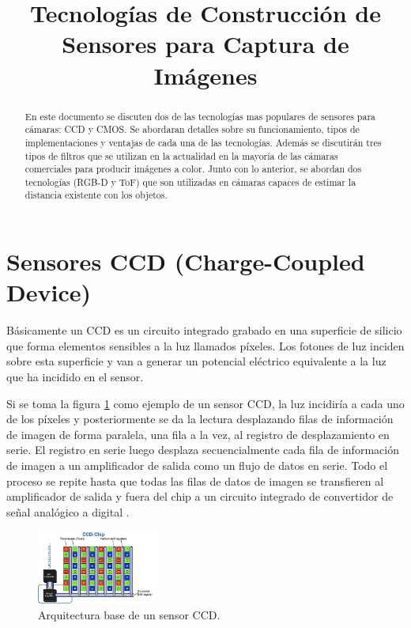 \documentclass[conference]{IEEEtran}
\begin{document}
\title{Tecnologías de Construcción de Sensores para Captura de Imágenes}

\author{
}


\maketitle
\thispagestyle{plain}
\pagestyle{plain}

\begin{abstract}
En este documento se discuten dos de las tecnologías mas populares de sensores para cámaras: CCD y CMOS. Se abordaran detalles sobre su funcionamiento, tipos de implementaciones y ventajas de cada una de las tecnologías. Además se discutirán tres tipos de filtros que se utilizan en la actualidad en la mayoría de las cámaras comerciales para producir imágenes a color.
Junto con lo anterior, se abordan dos tecnologías (RGB-D y ToF) que son utilizadas en cámaras capaces de estimar la distancia existente con los objetos.
\end{abstract}


\section{\textbf{Sensores CCD (Charge-Coupled Device)}}
Básicamente un CCD es un circuito integrado grabado en una superficie de silicio que forma elementos sensibles a la luz llamados píxeles. Los fotones de luz inciden sobre esta superficie y van a generar un potencial eléctrico equivalente a la luz que ha incidido en el sensor.

Si se toma la figura \ref{sensor_ccd} como ejemplo de un sensor CCD, la luz incidiría a cada uno de los píxeles y posteriormente se da la lectura desplazando filas de información de imagen de forma paralela, una fila a la vez, al registro de desplazamiento en serie. El registro en serie luego desplaza secuencialmente cada fila de información de imagen a un amplificador de salida como un flujo de datos en serie. Todo el proceso se repite hasta que todas las filas de datos de imagen se transfieren al amplificador de salida y fuera del chip a un circuito integrado de convertidor de señal analógico a digital \cite{ccd_sensor1}.

\begin{figure}[H]
\centering
\includegraphics[width=4cm]{ccd}
\caption{Arquitectura base de un sensor CCD.}
\label{sensor_ccd}
\end{figure}
\end{document}
